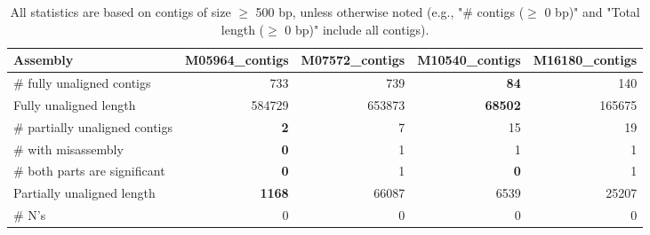 \documentclass[12pt,a4paper]{article}
\begin{document}
\begin{table}[ht]
\begin{center}
\caption{All statistics are based on contigs of size $\geq$ 500 bp, unless otherwise noted (e.g., "\# contigs ($\geq$ 0 bp)" and "Total length ($\geq$ 0 bp)" include all contigs).}
\begin{tabular}{|l*{4}{|r}|}
\hline
Assembly & M05964\_contigs & M07572\_contigs & M10540\_contigs & M16180\_contigs \\ \hline
\# fully unaligned contigs & 733 & 739 & {\bf 84} & 140 \\ \hline
Fully unaligned length & 584729 & 653873 & {\bf 68502} & 165675 \\ \hline
\# partially unaligned contigs & {\bf 2} & 7 & 15 & 19 \\ \hline
\hspace{5mm}\# with misassembly & {\bf 0} & 1 & 1 & 1 \\ \hline
\hspace{5mm}\# both parts are significant & {\bf 0} & 1 & {\bf 0} & 1 \\ \hline
Partially unaligned length & {\bf 1168} & 66087 & 6539 & 25207 \\ \hline
\# N's & 0 & 0 & 0 & 0 \\ \hline
\end{tabular}
\end{center}
\end{table}
\end{document}
